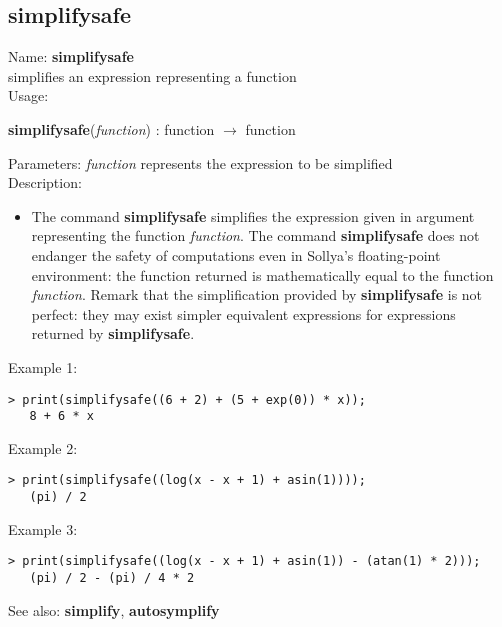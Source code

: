 \subsection{ simplifysafe }
\noindent Name: \textbf{simplifysafe}\\
simplifies an expression representing a function\\

\noindent Usage: 
\begin{center}
\textbf{simplifysafe}(\emph{function}) : \textsf{function} $\rightarrow$ \textsf{function}\\
\end{center}
Parameters: 
\emph{function} represents the expression to be simplified\\

\noindent Description: \begin{itemize}

\item The command \textbf{simplifysafe} simplifies the expression given in argument
   representing the function \emph{function}.  The command \textbf{simplifysafe} does not
   endanger the safety of computations even in Sollya's floating-point
   environment: the function returned is mathematically equal to the
   function \emph{function}. 
   Remark that the simplification provided by \textbf{simplifysafe} is not perfect:
   they may exist simpler equivalent expressions for expressions returned
   by \textbf{simplifysafe}.
\end{itemize}
\noindent Example 1: 
\begin{center}\begin{minipage}{14.8cm}\begin{Verbatim}[frame=single]
   > print(simplifysafe((6 + 2) + (5 + exp(0)) * x));
   8 + 6 * x
\end{Verbatim}
\end{minipage}\end{center}
\noindent Example 2: 
\begin{center}\begin{minipage}{14.8cm}\begin{Verbatim}[frame=single]
   > print(simplifysafe((log(x - x + 1) + asin(1))));
   (pi) / 2
\end{Verbatim}
\end{minipage}\end{center}
\noindent Example 3: 
\begin{center}\begin{minipage}{14.8cm}\begin{Verbatim}[frame=single]
   > print(simplifysafe((log(x - x + 1) + asin(1)) - (atan(1) * 2)));
   (pi) / 2 - (pi) / 4 * 2
\end{Verbatim}
\end{minipage}\end{center}
See also: \textbf{simplify}, \textbf{autosymplify}
